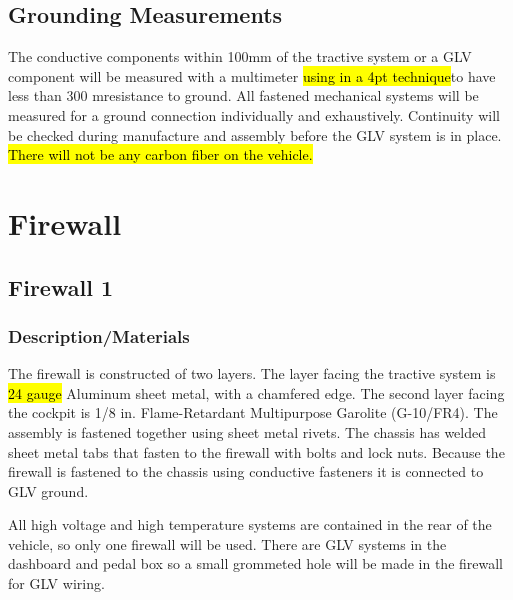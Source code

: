 \documentclass{article}
\DeclareRobustCommand{\hlr}[1]{{\sethlcolor{red}\hl{#1}}}
\begin{document}
    \subsection{Grounding Measurements}

        The conductive components within 100mm of the tractive system or a GLV component will be measured with a multimeter \hlr{using in a 4pt technique}to have less than 300 m\ohm resistance to ground. All fastened mechanical systems will be measured for a ground connection individually and exhaustively. Continuity will be checked during manufacture and assembly before the GLV system is in place.\\

        \hlr{There will not be any carbon fiber on the vehicle.}

\newpage

\section{Firewall}

    \subsection{Firewall 1}

        \subsubsection{Description/Materials}

            The firewall is constructed of two layers. The layer facing the tractive system is \hlr{24 gauge} Aluminum sheet metal, with a chamfered edge. The second layer facing the cockpit is 1/8 in. Flame-Retardant Multipurpose Garolite (G-10/FR4). The assembly is fastened together using sheet metal rivets. The chassis has welded sheet metal tabs that fasten to the firewall with bolts and lock nuts. Because the firewall is fastened to the chassis using conductive fasteners it is connected to GLV ground.

            All high voltage and high temperature systems are contained in the rear of the vehicle, so only one firewall will be used. There are GLV systems in the dashboard and pedal box so a small grommeted hole will be made in the firewall for GLV wiring.
\end{document}
